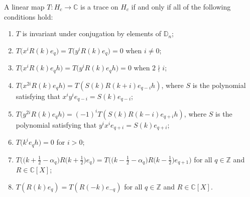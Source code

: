 \documentclass[10pt,a4paper]{amsart}
\newcommand\CC{\mathbb{C}}
\newcommand\DD{\mathbb{D}}
\newcommand\ZZ{\mathbb{Z}}
\newcommand\half{\ensuremath{\frac{1}{2}}}
\newcommand\numbers{\textup{(\arabic*)}}
\begin{document}
\begin{Theorem}
 \label{thm:classif}
 A linear map $T\colon H_c \to \CC$
 is a trace on $H_c$ if and only if
 all of the following conditions hold:
 \begin{enumerate}[label=\numbers]\itemsep=0pt
 \item $T$ is invariant under conjugation
 by elements of $\DD_n$;
 \label{cond:inv}
 \item $T\bigl(x^i R(k) e_q\bigr) = T\bigl(y^i R(k) e_q\bigr) = 0$
 when $i \neq 0$;
 \label{cond:g0}
 \item $T\bigl(x^i R(k) e_q h\bigr) = T\bigl(y^i R(k) e_q h\bigr) = 0$
 when $2 \nmid i$;
 \label{cond:h0}
 \item $T\bigl(x^{2i} R(k) e_q h\bigr) = T(S(k) R(k + i) e_{q - i} h)$,
 where $S$ is the polynomial
 satisfying that $x^i y^i e_{q - i}\allowbreak = S(k) e_{q - i}$;
 \label{cond:h_av}
 \item $T\bigl(y^{2i} R(k) e_q h\bigr) = (-1)^i T(S(k) R(k - i) e_{q + i} h)$,
 where $S$ is the polynomial
 satisfying that $y^i x^i e_{q + i} = S(k) e_{q + i}$;
 \label{cond:h_av_flip}
 \item $T\bigl(k^i e_q h\bigr) = 0$ for $i > 0$;
 \label{cond:k_poly}
 \item $T\bigl( \bigl(k + \half - \alpha_q\bigr) R\bigl(k + \half\bigr) e_q\bigr) =
 T\bigl( \bigl(k - \half - \alpha_q\bigr) R\bigl(k - \half\bigr) e_{q + 1}\bigr)$
 for all $q \in \ZZ$ and $R \in \CC[X]$;
 \label{cond:shift}
 \item $T( R(k) e_q ) = T( R(-k) e_{-q} )$
 for all $q \in \ZZ$ and $R \in \CC[X]$.
 \label{cond:even}
 \end{enumerate}
\end{Theorem}
\end{document}
